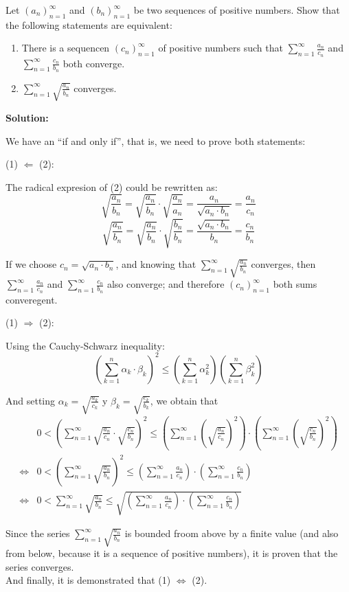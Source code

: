 \documentclass[../../main.tex]{subfiles}
\begin{document}
  \begin{shaded}
    Let $(a_n)_{n = 1}^\infty$ and $(b_n)_{n = 1}^\infty$ be two sequences of positive numbers. Show that the following statements are equivalent:

    \begin{enumerate}[(1)]
      \item There is a sequencen $(c_n)_{n = 1}^\infty$ of positive numbers such that $\displaystyle\sum_{n = 1}^\infty \frac{a_n}{c_n}$ and $\displaystyle\sum_{n = 1}^\infty \frac{c_n}{b_n}$ both converge.
      \item $\displaystyle\sum_{n = 1}^\infty \sqrt{\frac{a_n}{b_n}}$ converges.
    \end{enumerate}
  \end{shaded}

  \textbf{Solution:}

  We have an ``if and only if'', that is, we need to prove both statements:

  (1) $\Longleftarrow$ (2):

  The radical expresion of (2) could be rewritten as:
  $$
  \sqrt{\frac{a_n}{b_n}} = \sqrt{\frac{a_n}{b_n}} \cdot \sqrt{\frac{a_n}{a_n}} = \frac{a_n}{\sqrt{a_n \cdot b_n}} = \frac{a_n}{c_n}
  $$
  $$
  \sqrt{\frac{a_n}{b_n}} = \sqrt{\frac{a_n}{b_n}} \cdot \sqrt{\frac{b_n}{b_n}} = \frac{\sqrt{a_n \cdot b_n}}{b_n} = \frac{c_n}{b_n}
  $$

  If we choose $c_n = \sqrt{a_n \cdot b_n}$, and knowing that $\displaystyle\sum_{n = 1}^\infty \sqrt{\frac{a_n}{b_n}}$ converges, then $\displaystyle\sum_{n = 1}^\infty \frac{a_n}{c_n}$ and $\displaystyle\sum_{n = 1}^\infty \frac{c_n}{b_n}$ also converge; and therefore $(c_n)_{n = 1}^\infty$ both sums converegent.

  (1) $\Longrightarrow$ (2):

  Using the Cauchy-Schwarz inequality:
  $$
  \left(\sum _{k = 1}^n \alpha_k \cdot \beta_k\right)^2 \leq \left(\sum _{k = 1}^n \alpha_k^2\right)\left(\sum _{k=1}^n \beta_k^2\right)
  $$

  And setting $\alpha_k = \displaystyle\sqrt{\frac{a_k}{c_k}}$ y $\beta_k = \displaystyle\sqrt{\frac{c_k}{b_k}}$, we obtain that
  \begin{equation*}
    \begin{split}
      & 0 < \left(\sum_{n = 1}^\infty \sqrt{\frac{a_n}{c_n}} \cdot \sqrt{\frac{c_n}{b_n}}\right)^2 \leq \left(\sum_{n = 1}^\infty \left(\sqrt{\frac{a_n}{c_n}}\right)^2\right)
      \cdot
      \left(\sum_{n = 1}^\infty \left(\sqrt{\frac{c_n}{b_n}}\right)^2\right) \\ \iff &
      0 < \left(\sum_{n = 1}^\infty \sqrt{\frac{a_n}{b_n}}\right)^2 \leq \left(\sum_{n = 1}^\infty \frac{a_n}{c_n}\right)
      \cdot
      \left(\sum_{n = 1}^\infty \frac{c_n}{b_n}\right) \\ \iff &
      0 < \sum_{n = 1}^\infty \sqrt{\frac{a_n}{b_n}} \leq \sqrt{\left(\sum_{n = 1}^\infty \frac{a_n}{c_n}\right)
      \cdot
      \left(\sum_{n = 1}^\infty \frac{c_n}{b_n}\right)}
    \end{split}
  \end{equation*}

  Since the series $\displaystyle\sum_{n = 1}^\infty \sqrt{\frac{a_n}{b_n}}$ is bounded froom above by a finite value (and also from below, because it is a sequence of positive numbers), it is proven that the series converges. \\

  And finally, it is demonstrated that (1) $\iff$ (2).
\end{document}
